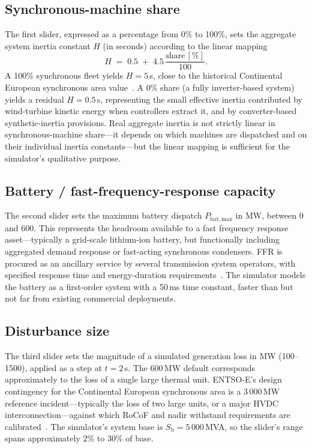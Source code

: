 \documentclass[conference]{IEEEtran}
\begin{document}
\subsection{Synchronous-machine share}
The first slider, expressed as a percentage from 0\% to 100\%, sets the aggregate system inertia constant $H$ (in seconds) according to the linear mapping
\begin{equation}
H \;=\; 0.5 \;+\; 4.5\,\frac{\text{share}\,[\%]}{100}.
\end{equation}
A 100\% synchronous fleet yields $H = 5$\,s, close to the historical Continental European synchronous area value~\cite{tielens2016relevance,ulbig2014impact}. A 0\% share (a fully inverter-based system) yields a residual $H = 0.5$\,s, representing the small effective inertia contributed by wind-turbine kinetic energy when controllers extract it, and by converter-based synthetic-inertia provisions. Real aggregate inertia is not strictly linear in synchronous-machine share---it depends on which machines are dispatched and on their individual inertia constants---but the linear mapping is sufficient for the simulator's qualitative purpose.

\subsection{Battery / fast-frequency-response capacity}
The second slider sets the maximum battery dispatch $P_{\mathrm{bat,max}}$ in MW, between 0 and 600. This represents the headroom available to a fast frequency response asset---typically a grid-scale lithium-ion battery, but functionally including aggregated demand response or fast-acting synchronous condensers. FFR is procured as an ancillary service by several transmission system operators, with specified response time and energy-duration requirements~\cite{denholm2020inertia,nerc2015erstf}. The simulator models the battery as a first-order system with a 50\,ms time constant, faster than but not far from existing commercial deployments.

\subsection{Disturbance size}
The third slider sets the magnitude of a simulated generation loss in MW (100--1500), applied as a step at $t = 2$\,s. The 600\,MW default corresponds approximately to the loss of a single large thermal unit. ENTSO-E's design contingency for the Continental European synchronous area is a 3\,000\,MW reference incident---typically the loss of two large units, or a major HVDC interconnection---against which RoCoF and nadir withstand requirements are calibrated~\cite{entsoe2020inertia,entsoe2017hpopeips}. The simulator's system base is $S_{\mathrm{b}} = 5\,000$\,MVA, so the slider's range spans approximately 2\% to 30\% of base.
\end{document}
